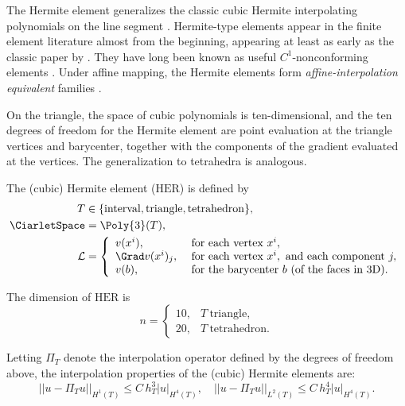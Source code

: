 The Hermite element generalizes the classic cubic Hermite
interpolating polynomials on the line segment
\citep{Ciarlet2002}. Hermite-type elements appear in the finite
element literature almost from the beginning, appearing at least as
early as the classic paper by \citet{CiarletRaviart1972}. They have
long been known as useful $C^1$-nonconforming elements
\citep{Braess2007,Ciarlet2002}.  Under affine mapping, the Hermite
elements form \emph{affine-interpolation equivalent} families
\citep{BrennerScott2008}.

On the triangle, the space of cubic polynomials is ten-dimensional,
and the ten degrees of freedom for the Hermite element are point
evaluation at the triangle vertices and barycenter, together with the
components of the gradient evaluated at the vertices. The
generalization to tetrahedra is analogous.
\begin{definition}
  The (cubic) Hermite element ($\mathrm{HER}$) is defined by
  \begin{align}
    T &\in \{ \mathrm{interval}{}, \mathrm{triangle}{}, \mathrm{tetrahedron}{}\}, \\
    \CiarletSpace &= \Poly{3}(T), \\
    \mathcal{L} &=
    \left \{
    \begin{array}{ll}
      v(x^i),
      &\text{ for each vertex } x^i, \\
      \Grad v(x^i)_j,
      &\text{ for each vertex } x^i, \text{ and each component } j, \\
      v(b),
      &\text{ for the barycenter $b$ (of the faces in 3D). }
    \end{array}
    \right.
  \end{align}
\end{definition}
The dimension of $\mathrm{HER}$ is
\begin{equation}
  n = \left \{
    \begin{array}{ll}
      10, & T~\mathrm{triangle}, \\
      20, & T~\mathrm{tetrahedron}.
    \end{array}
    \right.
\end{equation}

Letting $\Pi_T$ denote the interpolation operator defined by the
degrees of freedom above, the interpolation properties of the (cubic)
Hermite elements are:
\begin{equation}
  ||u - \Pi_T u||_{H^1(T)} \leqslant C \, h_T^{3} |u|_{H^4(T)}, \quad
  ||u - \Pi_T u||_{L^2(T)} \leqslant C \, h_T^{4} |u|_{H^4(T)}.
\end{equation}

